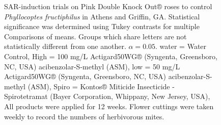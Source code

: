 \documentclass{ufdissertation}[overrideChapters] %
\begin{document}
{\begin{figure}
{}

\caption[SAR-induction trials on Pink Double Knock Out® roses to control \textit{Phyllocoptes fructiphilus} in Athens and Griffin, GA]{SAR-induction trials on Pink Double Knock Out® roses to control \textit{Phyllocoptes fructiphilus} in Athens and Griffin, GA. Statistical significance was determined using Tukey contrasts for multiple Comparisons of means. Groups which share letters are not statistically different from one another. $\alpha = 0.05$. water = Water Control, High = 100 \si{\milli\gram}/\si{\liter} Actigard50WG® (Syngenta, Greensboro, NC, USA) acibenzolar-S-methyl (ASM), low = 50 \si{\milli\gram}/\si{\liter} Actigard50WG® (Syngenta, Greensboro, NC, USA) acibenzolar-S-methyl (ASM), Spiro = Kontos® Miticide Insecticide - Spirotetramat (Bayer Corporation, Whippany, New Jersey, USA), All products were applied for 12 weeks. Flower cuttings were taken weekly to record the numbers of herbivorous mites.}\label{fig:asm-graph}
\end{figure}
\begin{landscape}\begin{table}


\end{table}
\end{landscape}}
\end{document}
